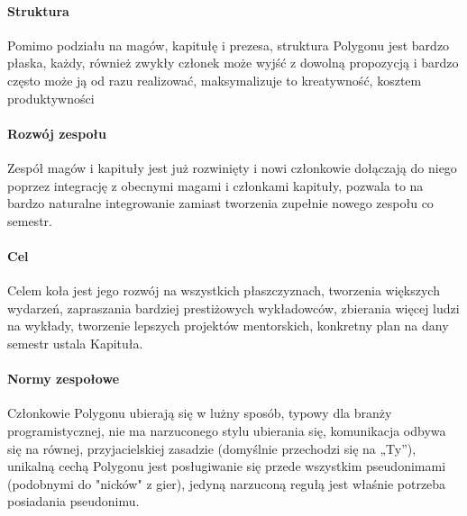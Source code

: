 \documentclass{article}[12pt]
\begin{document}
\paragraph{Struktura}
Pomimo podziału na magów, kapitułę i prezesa, struktura Polygonu jest bardzo płaska, każdy, również zwykły członek może wyjść z dowolną propozycją i bardzo często może ją od razu realizować, maksymalizuje to kreatywność, kosztem produktywności
\paragraph{Rozwój zespołu} 
Zespół magów i kapituły jest już rozwinięty i nowi członkowie dołączają do niego poprzez integrację z obecnymi magami i członkami kapituły, pozwala to na bardzo naturalne integrowanie zamiast tworzenia zupełnie nowego zespołu co semestr.
\paragraph{Cel}
Celem koła jest jego rozwój na wszystkich płaszczyznach, tworzenia większych wydarzeń, zapraszania bardziej prestiżowych wykładowców, zbierania więcej ludzi na wykłady, tworzenie lepszych projektów mentorskich, konkretny plan na dany semestr ustala Kapituła. 
\paragraph{Normy zespołowe}
Członkowie Polygonu ubierają się w lużny sposób, typowy dla branży programistycznej, nie ma narzuconego stylu ubierania się, komunikacja odbywa się na równej, przyjacielskiej zasadzie (domyślnie przechodzi się na „Ty”), unikalną cechą Polygonu jest posługiwanie się przede wszystkim pseudonimami (podobnymi do "nicków" z gier), jedyną narzuconą regułą jest właśnie potrzeba posiadania pseudonimu.
\end{document}
